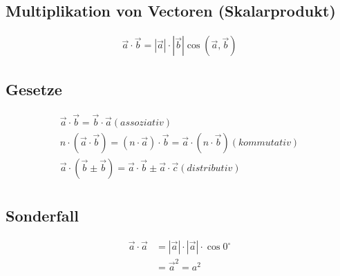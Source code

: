 \subsection{Multiplikation von Vectoren (Skalarprodukt)}
\begin{align*}
 \vec{a} \cdot \vec{b} =  |\vec{a}| \cdot |\vec{b}| \cos{(\vec{a},\vec{b})}
\end{align*}


\subsection{Gesetze}
\begin{align*}
 \vec{a} \cdot \vec{b} = \vec{b} \cdot \vec{a} (assoziativ) \\
 n \cdot (\vec{a} \cdot \vec{b}) =  (n \cdot \vec{a}) \cdot \vec{b} = \vec{a} \cdot(n \cdot \vec{b})  (kommutativ) \\
 \vec{a} \cdot (\vec{b} \pm \vec{b}) = \vec{a} \cdot \vec{b} \pm  \vec{a} \cdot \vec{c} (distributiv) \\
\end{align*}

\subsection{Sonderfall}
\begin{align*}
 \vec{a} \cdot \vec{a} &= |\vec{a}| \cdot |\vec{a}| \cdot \cos 0^\circ \\
 &=  \vec{a}^2 = a^2
\end{align*}

